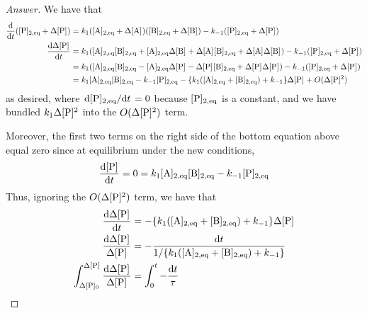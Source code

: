 \documentclass[../psets.tex]{subfiles}
\begin{document}
\begin{enumerate}[label={\textbf{28-\arabic*.}},leftmargin=3.5em]
    \begin{proof}[Answer]
        We have that
        \begin{align*}
            \dv{t}(\cnc[2,eq]{P}+\Delta\cnc{P}) &= k_1(\cnc[2,eq]{A}+\Delta\cnc{A})(\cnc[2,eq]{B}+\Delta\cnc{B})-k_{-1}(\cnc[2,eq]{P}+\Delta\cnc{P})\\
            \dv{\Delta\cnc{P}}{t} &= k_1(\cnc[2,eq]{A}\cnc[2,eq]{B}+\cnc[2,eq]{A}\Delta\cnc{B}+\Delta\cnc{A}\cnc[2,eq]{B}+\Delta\cnc{A}\Delta\cnc{B})-k_{-1}(\cnc[2,eq]{P}+\Delta\cnc{P})\\
            &= k_1(\cnc[2,eq]{A}\cnc[2,eq]{B}-\cnc[2,eq]{A}\Delta\cnc{P}-\Delta\cnc{P}\cnc[2,eq]{B}+\Delta\cnc{P}\Delta\cnc{P})-k_{-1}(\cnc[2,eq]{P}+\Delta\cnc{P})\\
            &= k_1\cnc[2,eq]{A}\cnc[2,eq]{B}-k_{-1}\cnc[2,eq]{P}-\{k_1(\cnc[2,eq]{A}+\cnc[2,eq]{B})+k_{-1}\}\Delta\cnc{P}+O(\Delta\cnc{P}^2)
        \end{align*}
        as desired, where $\dv*{\cnc[2,eq]{P}}{t}=0$ because $\cnc[2,eq]{P}$ is a constant, and we have bundled $k_1\Delta\cnc{P}^2$ into the $O(\Delta\cnc{P}^2)$ term.\par
        Moreover, the first two terms on the right side of the bottom equation above equal zero since at equilibrium under the new conditions,
        \begin{equation*}
            \dv{\cnc{P}}{t} = 0
            = k_1\cnc[2,eq]{A}\cnc[2,eq]{B}-k_{-1}\cnc[2,eq]{P}
        \end{equation*}
        Thus, ignoring the $O(\Delta\cnc{P}^2)$ term, we have that
        \begin{align*}
            \dv{\Delta\cnc{P}}{t} &= -\{k_1(\cnc[2,eq]{A}+\cnc[2,eq]{B})+k_{-1}\}\Delta\cnc{P}\\
            \frac{\dd{\Delta\cnc{P}}}{\Delta\cnc{P}} &= -\frac{\dd{t}}{1/\{k_1(\cnc[2,eq]{A}+\cnc[2,eq]{B})+k_{-1}\}}\\
            \int_{\Delta\cnc[0]{P}}^{\Delta\cnc{P}}\frac{\dd{\Delta\cnc{P}}}{\Delta\cnc{P}} &= \int_0^t-\frac{\dd{t}}{\tau}\\

\end{align*}
\end{proof}
\end{enumerate}
\end{document}
